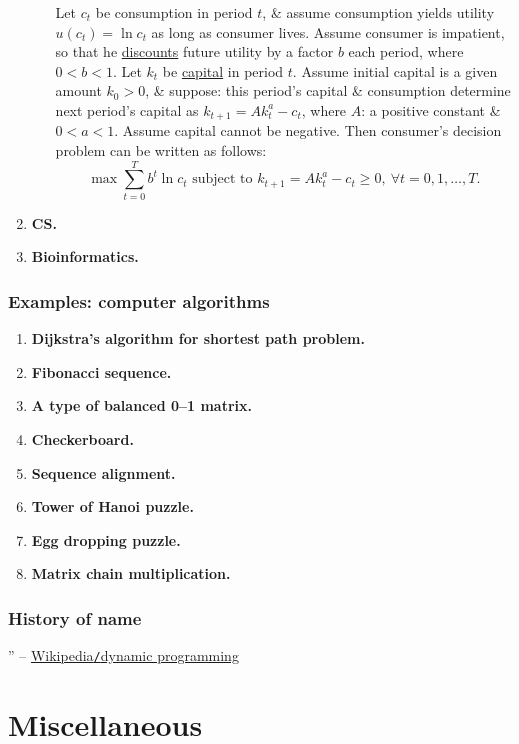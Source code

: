 \documentclass{article}
\begin{document}
\begin{enumerate}
\begin{itemize}
		Let $c_t$ be consumption in period $t$, \& assume consumption yields utility $u(c_t) = \ln c_t$ as long as consumer lives. Assume consumer is impatient, so that he \href{https://en.wikipedia.org/wiki/Discounting}{discounts} future utility by a factor $b$ each period, where $0 < b < 1$. Let $k_t$ be \href{https://en.wikipedia.org/wiki/Capital_(economics)}{capital} in period $t$. Assume initial capital is a given amount $k_0 > 0$, \& suppose: this period's capital \& consumption determine next period's capital as $k_{t+1} = Ak_t^a - c_t$, where $A$: a positive constant \& $0 < a < 1$. Assume capital cannot be negative. Then consumer's decision problem can be written as follows:
		\begin{equation*}
			\max\sum_{t=0}^T b^t\ln c_t\mbox{ subject to } k_{t+1} = Ak_t^a - c_t\ge0,\ \forall t = 0,1,\ldots,T.
		\end{equation*}
	\end{itemize}
	\item {\bf CS.}
	\item {\bf Bioinformatics.}
\end{enumerate}

\subsubsection{Examples: computer algorithms}

\begin{enumerate}
	\item {\bf Dijkstra's algorithm for shortest path problem.}
	\item {\bf Fibonacci sequence.}
	\item {\bf A type of balanced 0--1 matrix.}
	\item {\bf Checkerboard.}
	\item {\bf Sequence alignment.}
	\item {\bf Tower of Hanoi puzzle.}
	\item {\bf Egg dropping puzzle.}
	\item {\bf Matrix chain multiplication.}
\end{enumerate}

\subsubsection{History of name}

'' -- \href{https://en.wikipedia.org/wiki/Dynamic_programming}{Wikipedia{\tt/}dynamic programming}


\section{Miscellaneous}


\printbibliography[heading=bibintoc]
	
\end{document}

